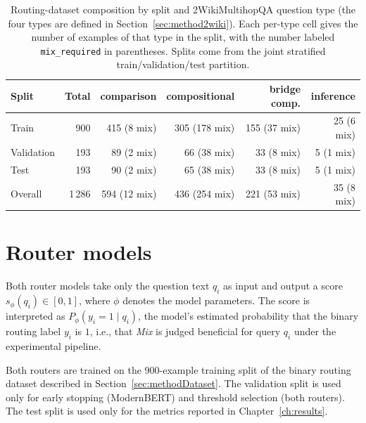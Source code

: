 \documentclass[english, bibtex]{kththesis}               %
\numberwithin{listing}{chapter}
\providecommand{\DIFaddtex}[1]{{\protect\color{blue} \sf #1}} %
\providecommand{\DIFaddbegin}{} %
\providecommand{\DIFaddbeginFL}{} %
\providecommand{\DIFaddendFL}{} %
\providecommand{\DIFdelbeginFL}{} %
\providecommand{\DIFdelendFL}{} %
\providecommand{\DIFadd}[1]{\texorpdfstring{\DIFaddtex{#1}}{#1}} %
\begin{document}
\begin{table}[!ht]
\begin{center}
\caption{Routing-dataset composition by split and 2WikiMultihopQA question type (the four types are defined in Section~\ref{sec:method2wiki}). Each per-type cell gives the number of examples of that type in the split, with the number labeled \texttt{mix\_required} in parentheses. Splits come from the joint stratified train/validation/test partition.}
\label{tab:datasetSummary}
\DIFdelbeginFL %
\DIFdelendFL \DIFaddbeginFL \small
\DIFaddendFL \setlength{\tabcolsep}{3pt}
\begin{tabular}{l|r|rrrr}
\textbf{Split} & \textbf{Total} & \textbf{comparison} & \textbf{compositional} & \textbf{bridge comp.} & \textbf{inference} \\
\hline
Train & 900 & 415 (8 mix) & 305 (178 mix) & 155 (37 mix) & 25 (6 mix) \\
Validation & 193 & 89 (2 mix) & 66 (38 mix) & 33 (8 mix) & 5 (1 mix) \\
Test & 193 & 90 (2 mix) & 65 (38 mix) & 33 (8 mix) & 5 (1 mix) \\
\hline
Overall & 1\,286 & 594 (12 mix) & 436 (254 mix) & 221 (53 mix) & 35 (8 mix) \\
\end{tabular}
\end{center}
\end{table}

\section{Router models}
\label{sec:methodRouters}
\label{sec:implTraining}

Both router models take only the question text $q_i$ as input and output a score \(s_\phi(q_i) \in [0,1]\), where $\phi$ denotes the model parameters. The score is interpreted as $P_\phi(y_i = 1 \mid q_i)$, the model's estimated probability that the binary routing label $y_i$ is $1$, i.e., that \emph{Mix} is judged beneficial for query $q_i$ under the experimental pipeline.

\DIFaddbegin \DIFadd{Both routers are trained on the 900-example training split of the binary routing dataset described in Section~\ref{sec:methodDataset}. The validation split is used only for early stopping (ModernBERT) and threshold selection (both routers). The test split is used only for the metrics reported in Chapter~\ref{ch:results}.
}
\end{document}
